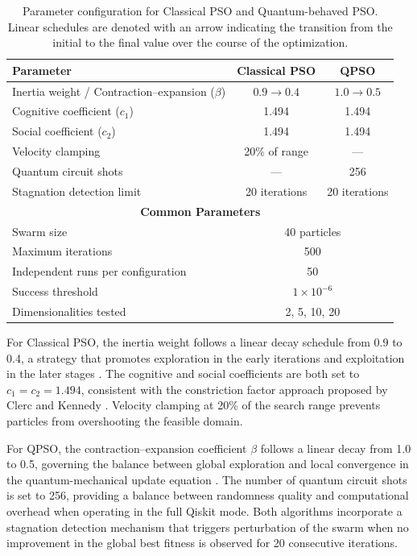 \begin{table}[htbp]
\centering
\caption{Parameter configuration for Classical PSO and Quantum-behaved PSO. Linear schedules are denoted with an arrow indicating the transition from the initial to the final value over the course of the optimization.}
\label{tab:parameters}
\begin{tabular}{@{}lcc@{}}
\toprule
\textbf{Parameter} & \textbf{Classical PSO} & \textbf{QPSO} \\
\midrule
Inertia weight / Contraction--expansion ($\beta$) & $0.9 \to 0.4$ & $1.0 \to 0.5$ \\
Cognitive coefficient ($c_1$) & 1.494 & 1.494 \\
Social coefficient ($c_2$) & 1.494 & 1.494 \\
Velocity clamping & 20\% of range & --- \\
Quantum circuit shots & --- & 256 \\
Stagnation detection limit & 20 iterations & 20 iterations \\
\midrule
\multicolumn{3}{c}{\textbf{Common Parameters}} \\
\midrule
Swarm size & \multicolumn{2}{c}{40 particles} \\
Maximum iterations & \multicolumn{2}{c}{500} \\
Independent runs per configuration & \multicolumn{2}{c}{50} \\
Success threshold & \multicolumn{2}{c}{$1 \times 10^{-6}$} \\
Dimensionalities tested & \multicolumn{2}{c}{2, 5, 10, 20} \\
\bottomrule
\end{tabular}
\end{table}

For Classical PSO, the inertia weight follows a linear decay schedule from 0.9 to 0.4, a strategy that promotes exploration in the early iterations and exploitation in the later stages \cite{Shi1998}. The cognitive and social coefficients are both set to $c_1 = c_2 = 1.494$, consistent with the constriction factor approach proposed by Clerc and Kennedy \cite{Clerc2002}. Velocity clamping at 20\% of the search range prevents particles from overshooting the feasible domain.

For QPSO, the contraction--expansion coefficient $\beta$ follows a linear decay from 1.0 to 0.5, governing the balance between global exploration and local convergence in the quantum-mechanical update equation \cite{Sun2004}. The number of quantum circuit shots is set to 256, providing a balance between randomness quality and computational overhead when operating in the full Qiskit mode. Both algorithms incorporate a stagnation detection mechanism that triggers perturbation of the swarm when no improvement in the global best fitness is observed for 20 consecutive iterations.


